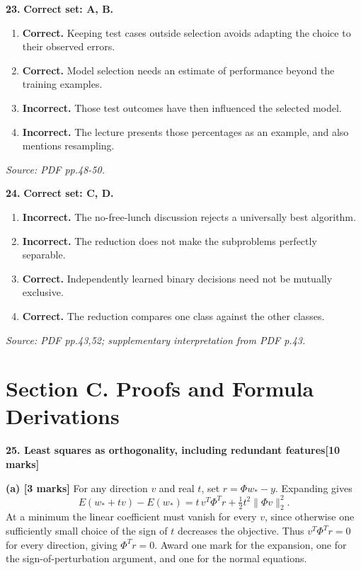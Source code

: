\documentclass[11pt,a4paper]{article}
\begin{document}
\par\noindent\begin{minipage}{\linewidth}
\textbf{23.} \textbf{Correct set: A, B.}
\begin{enumerate}[label=(\Alph*),leftmargin=8mm,itemsep=2pt,topsep=2pt]
\item \textbf{Correct.} Keeping test cases outside selection avoids adapting the choice to their observed errors.
\item \textbf{Correct.} Model selection needs an estimate of performance beyond the training examples.
\item \textbf{Incorrect.} Those test outcomes have then influenced the selected model.
\item \textbf{Incorrect.} The lecture presents those percentages as an example, and also mentions resampling.
\end{enumerate}
{\footnotesize\textit{Source: PDF pp.48-50.}}

\end{minipage}\par\vspace{3mm}
\par\noindent\begin{minipage}{\linewidth}
\textbf{24.} \textbf{Correct set: C, D.}
\begin{enumerate}[label=(\Alph*),leftmargin=8mm,itemsep=2pt,topsep=2pt]
\item \textbf{Incorrect.} The no-free-lunch discussion rejects a universally best algorithm.
\item \textbf{Incorrect.} The reduction does not make the subproblems perfectly separable.
\item \textbf{Correct.} Independently learned binary decisions need not be mutually exclusive.
\item \textbf{Correct.} The reduction compares one class against the other classes.
\end{enumerate}
{\footnotesize\textit{Source: PDF pp.43,52; supplementary interpretation from PDF p.43.}}

\end{minipage}\par\vspace{3mm}
\newpage\section*{Section C. Proofs and Formula Derivations}
\textbf{25. Least squares as orthogonality, including redundant features}\hfill\textbf{[10 marks]}\par\medskip
\textbf{(a) [3 marks]} For any direction \(v\) and real \(t\), set \(r=\Phi w_*-y\). Expanding gives \[E(w_*+tv)-E(w_*)=t\,v^T\Phi^Tr+\tfrac12t^2\|\Phi v\|_2^2.\] At a minimum the linear coefficient must vanish for every \(v\), since otherwise one sufficiently small choice of the sign of \(t\) decreases the objective. Thus \(v^T\Phi^Tr=0\) for every direction, giving \(\Phi^Tr=0\). Award one mark for the expansion, one for the sign-of-perturbation argument, and one for the normal equations.
\end{document}
